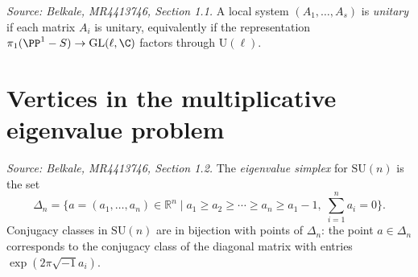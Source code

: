 \begin{definition}[IsUnitary]
  \label{def:unitary-local-system}
  \textit{Source: Belkale, MR4413746, Section 1.1.}
  A local system \((A_1, \ldots, A_s)\) is \emph{unitary} if each matrix \(A_i\) is unitary, equivalently if the representation \(\pi_1(\PP^1 - S) \to \mathrm{GL}(\ell, \C)\) factors through \(\mathrm{U}(\ell)\).
\end{definition}

\section{Vertices in the multiplicative eigenvalue problem}

\begin{definition}[EigenvalueSimplex]
  \label{def:delta-n}
  \uses{}
  \textit{Source: Belkale, MR4413746, Section 1.2.}
  The \emph{eigenvalue simplex} for \(\mathrm{SU}(n)\) is the set
  \[
    \Delta_n = \bigl\{ a = (a_1, \ldots, a_n) \in \mathbb{R}^n \mid a_1 \geq a_2 \geq \cdots \geq a_n \geq a_1 - 1,\; \textstyle\sum_{i=1}^n a_i = 0 \bigr\}.
  \]
  Conjugacy classes in \(\mathrm{SU}(n)\) are in bijection with points of \(\Delta_n\): the point \(a \in \Delta_n\) corresponds to the conjugacy class of the diagonal matrix with entries \(\exp(2\pi \sqrt{-1} a_i)\).
\end{definition}

